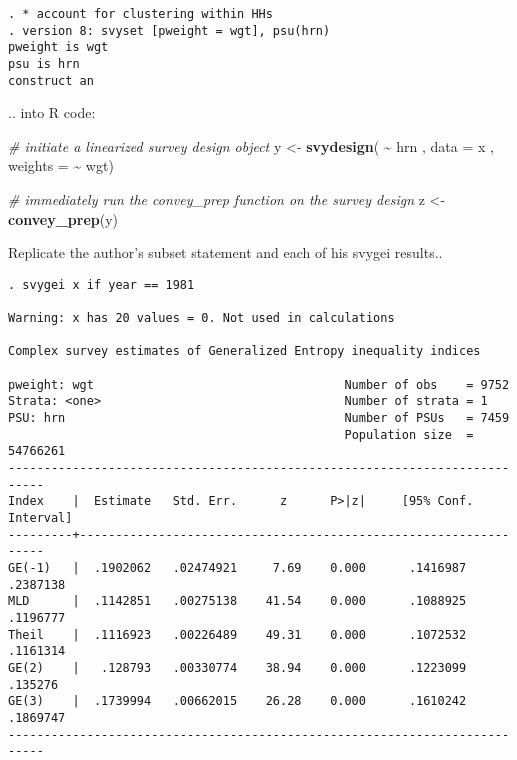 \documentclass[
]{book}
\newenvironment{Shaded}{\begin{snugshade}}{\end{snugshade}}
\newcommand{\AttributeTok}[1]{\textcolor[rgb]{0.13,0.29,0.53}{#1}}
\newcommand{\CommentTok}[1]{\textcolor[rgb]{0.56,0.35,0.01}{\textit{#1}}}
\newcommand{\FunctionTok}[1]{\textcolor[rgb]{0.13,0.29,0.53}{\textbf{#1}}}
\newcommand{\NormalTok}[1]{#1}
\newcommand{\OtherTok}[1]{\textcolor[rgb]{0.56,0.35,0.01}{#1}}
\newcommand{\SpecialCharTok}[1]{\textcolor[rgb]{0.81,0.36,0.00}{\textbf{#1}}}
\begin{document}
\begin{verbatim}
. * account for clustering within HHs 
. version 8: svyset [pweight = wgt], psu(hrn)
pweight is wgt
psu is hrn
construct an
\end{verbatim}

.. into R code:

\begin{Shaded}
\begin{Highlighting}[]
\CommentTok{\# initiate a linearized survey design object}
\NormalTok{y }\OtherTok{\textless{}{-}} \FunctionTok{svydesign}\NormalTok{( }\SpecialCharTok{\textasciitilde{}}\NormalTok{ hrn , }\AttributeTok{data =}\NormalTok{ x , }\AttributeTok{weights =} \SpecialCharTok{\textasciitilde{}}\NormalTok{ wgt)}

\CommentTok{\# immediately run the \textasciigrave{}convey\_prep\textasciigrave{} function on the survey design}
\NormalTok{z }\OtherTok{\textless{}{-}} \FunctionTok{convey\_prep}\NormalTok{(y)}
\end{Highlighting}
\end{Shaded}

Replicate the author's subset statement and each of his svygei results..

\begin{verbatim}
. svygei x if year == 1981
 
Warning: x has 20 values = 0. Not used in calculations

Complex survey estimates of Generalized Entropy inequality indices
 
pweight: wgt                                   Number of obs    = 9752
Strata: <one>                                  Number of strata = 1
PSU: hrn                                       Number of PSUs   = 7459
                                               Population size  = 54766261
---------------------------------------------------------------------------
Index    |  Estimate   Std. Err.      z      P>|z|     [95% Conf. Interval]
---------+-----------------------------------------------------------------
GE(-1)   |  .1902062   .02474921     7.69    0.000      .1416987   .2387138
MLD      |  .1142851   .00275138    41.54    0.000      .1088925   .1196777
Theil    |  .1116923   .00226489    49.31    0.000      .1072532   .1161314
GE(2)    |   .128793   .00330774    38.94    0.000      .1223099    .135276
GE(3)    |  .1739994   .00662015    26.28    0.000      .1610242   .1869747
---------------------------------------------------------------------------
\end{verbatim}
\end{document}
